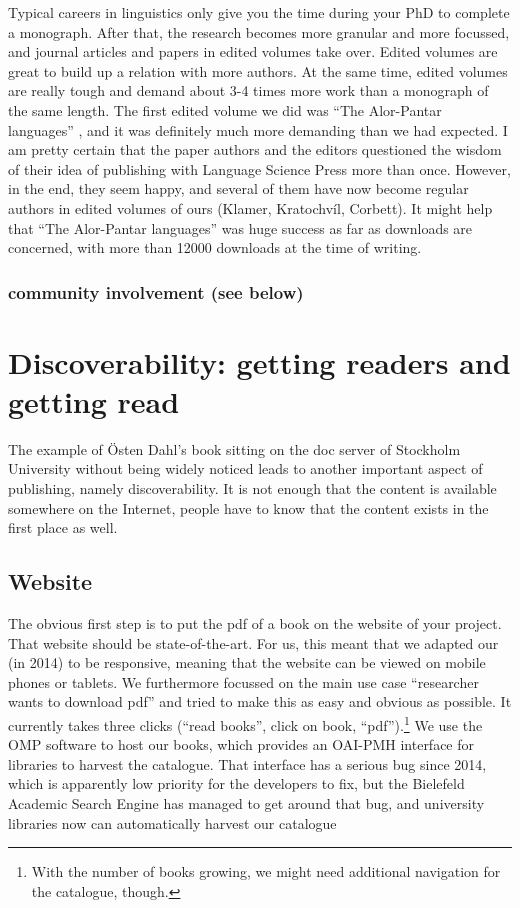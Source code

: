 \documentclass[output=guidelines,guidelines] {langscibook}
\begin{document}
Typical careers in linguistics only give you the time during your PhD to complete a monograph. After that, the research becomes more granular and more focussed, and journal articles and papers in edited volumes take over. Edited volumes are great to build up a relation with more authors. At the same time, edited volumes are really tough and demand about 3-4 times more work than a monograph of the same length. The first edited volume we did was ``The Alor-Pantar languages'' \citep{Klamer2014}, and it was definitely much more demanding than we had expected. I am pretty certain that the paper authors and the editors questioned the wisdom of their idea of publishing with Language Science Press more than once. However, in the end, they seem happy, and several of them have now become regular authors in edited volumes of ours (Klamer, Kratochvíl, Corbett). It might help that ``The Alor-Pantar languages'' was  huge success as far as downloads are concerned, with more than 12000 downloads at the time of writing. 

 
\subsubsection{community involvement (see below)}

\section{Discoverability: getting readers and getting read}
The example of Östen Dahl's book sitting on the doc server of Stockholm University without being widely noticed leads to another important aspect of publishing, namely discoverability. It is not enough that the content is available somewhere on the Internet, people have to know that the content exists in the first place as well. 

\subsection{Website}
The obvious first step is to put the pdf of a book on the website of your project. That website should be state-of-the-art. For us, this meant that we adapted our (in 2014) to be responsive, meaning that the website can be viewed on mobile phones or tablets. We furthermore focussed on the main use case ``researcher wants to download pdf'' and tried to make this as easy and obvious as possible. It currently takes three clicks (``read books'', click on book, ``pdf'').\footnote{With the number of books growing, we might need additional navigation for the catalogue, though.} We use the OMP software to host our books, which provides an OAI-PMH interface for libraries to harvest the catalogue. That interface has a serious bug since 2014, which is apparently low priority for the developers to fix, but the Bielefeld Academic Search Engine has managed to get around that bug, and university libraries now can automatically harvest our catalogue
\end{document}
